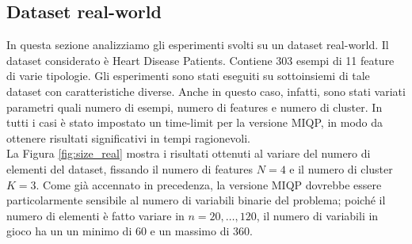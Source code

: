 \documentclass{article}
\begin{document}
    \subsection{Dataset real-world}
    In questa sezione analizziamo gli esperimenti svolti su un dataset real-world. Il dataset considerato è Heart Disease Patients. Contiene 303 esempi di 11 feature di varie tipologie.
    Gli esperimenti sono stati eseguiti su sottoinsiemi di tale dataset con caratteristiche diverse. Anche in questo caso, infatti, sono stati variati parametri quali numero di esempi, numero di features e numero di cluster. In tutti i casi è stato impostato un time-limit per la versione MIQP, in modo da ottenere risultati significativi in tempi ragionevoli.\\
    La Figura \ref{fig:size_real} mostra i risultati ottenuti al variare del numero di elementi del dataset, fissando il numero di features $N=4$ e il numero di cluster $K=3$. Come già accennato in precedenza, la versione MIQP dovrebbe essere particolarmente sensibile al numero di variabili binarie del problema; poiché il numero di elementi è fatto variare in $n=20,\dots,120$, il numero di variabili in gioco ha un un minimo di 60 e un massimo di 360.\\
\end{document}
